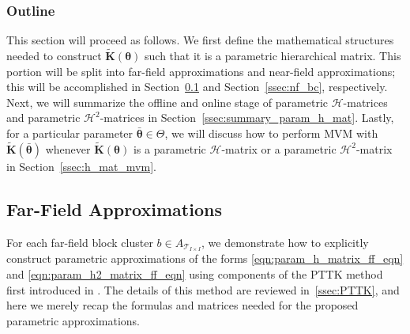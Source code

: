 \documentclass[final,3p,times]{elsarticle}
\newcommand{\mc}[1]{\mathcal{#1}}
\renewcommand{\vec}[1]{\boldsymbol{#1}}
\newcommand{\mathat}[1]{\widetilde{\boldsymbol{#1}}}
\begin{document}
\subsubsection{Outline}
This section will proceed as follows. We first define the mathematical structures needed to construct $\mathat{K}(\vec{\theta})$ such that it is a parametric hierarchical matrix. 
This portion will be split into far-field approximations and near-field approximations; this will be accomplished in Section~\ref{ssec:ff_bc} and Section~\ref{ssec:nf_bc}, respectively.  Next, we will summarize the offline and online stage of parametric $\mc{H}$-matrices and parametric $\mc{H}^{2}$-matrices in Section~\ref{ssec:summary_param_h_mat}. Lastly, for a particular parameter $\bar{\vec{\theta}} \in \Theta$, we will discuss how to perform MVM with $\mathat{K}(\bar{\vec{\theta}})$ whenever $\mathat{K}(\vec{\theta})$ is a parametric $\mc{H}$-matrix or a parametric $\mc{H}^{2}$-matrix in Section~\ref{ssec:h_mat_mvm}. 




\subsection{Far-Field Approximations}\label{ssec:ff_bc}
For each far-field block cluster $b \in A_{\mc{T}_{I \times I}}$, we demonstrate how to explicitly construct parametric  approximations of the forms \eqref{eqn:param_h_matrix_ff_eqn} and \eqref{eqn:param_h2_matrix_ff_eqn} using components of the PTTK method first introduced in \cite{khan2025parametric}. The details of this method are reviewed in~\ref{ssec:PTTK}, and here we merely recap the formulas and matrices needed for the proposed parametric  approximations.
\end{document}
